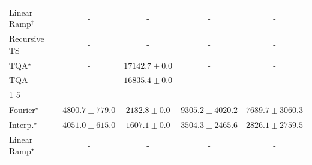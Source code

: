 \begin{tabular}{l|cccc|}
Linear Ramp$^\dagger$ & {\cellcolor[HTML]{000000}} \color[HTML]{F1F1F1} {\cellcolor{white}} \color{black} - & {\cellcolor[HTML]{000000}} \color[HTML]{F1F1F1} {\cellcolor{white}} \color{black} - & {\cellcolor[HTML]{000000}} \color[HTML]{F1F1F1} {\cellcolor{white}} \color{black} - & {\cellcolor[HTML]{000000}} \color[HTML]{F1F1F1} {\cellcolor{white}} \color{black} - \\
Recursive TS & {\cellcolor[HTML]{000000}} \color[HTML]{F1F1F1} {\cellcolor{white}} \color{black} - & {\cellcolor[HTML]{000000}} \color[HTML]{F1F1F1} {\cellcolor{white}} \color{black} - & {\cellcolor[HTML]{000000}} \color[HTML]{F1F1F1} {\cellcolor{white}} \color{black} - & {\cellcolor[HTML]{000000}} \color[HTML]{F1F1F1} {\cellcolor{white}} \color{black} - \\
TQA$^\star$ & {\cellcolor[HTML]{000000}} \color[HTML]{F1F1F1} {\cellcolor{white}} \color{black} - & {\cellcolor[HTML]{066D39}} \color[HTML]{F1F1F1} $17142.7\pm 0.0$ & {\cellcolor[HTML]{000000}} \color[HTML]{F1F1F1} {\cellcolor{white}} \color{black} - & {\cellcolor[HTML]{000000}} \color[HTML]{F1F1F1} {\cellcolor{white}} \color{black} - \\
TQA & {\cellcolor[HTML]{000000}} \color[HTML]{F1F1F1} {\cellcolor{white}} \color{black} - & {\cellcolor[HTML]{49AF61}} \color[HTML]{F1F1F1} $16835.4\pm 0.0$ & {\cellcolor[HTML]{000000}} \color[HTML]{F1F1F1} {\cellcolor{white}} \color{black} - & {\cellcolor[HTML]{000000}} \color[HTML]{F1F1F1} {\cellcolor{white}} \color{black} - \\
\cline{1-5}
\multicolumn{5}{c}{\rule{0pt}{8pt}SV} \\
\midrule
Fourier$^\star$ & {\cellcolor[HTML]{96B6D7}} \color[HTML]{000000} $4800.7\pm 779.0$ & {\cellcolor[HTML]{F4EDF6}} \color[HTML]{000000} $2182.8\pm 0.0$ & {\cellcolor[HTML]{023858}} \color[HTML]{F1F1F1} $9305.2\pm 4020.2$ & {\cellcolor[HTML]{0569A4}} \color[HTML]{F1F1F1} $7689.7\pm 3060.3$ \\
Interp.$^\star$ & {\cellcolor[HTML]{B9C6E0}} \color[HTML]{000000} $4051.0\pm 615.0$ & {\cellcolor[HTML]{FFF7FB}} \color[HTML]{000000} $1607.1\pm 0.0$ & {\cellcolor[HTML]{D1D2E6}} \color[HTML]{000000} $3504.3\pm 2465.6$ & {\cellcolor[HTML]{E5E1EF}} \color[HTML]{000000} $2826.1\pm 2759.5$ \\
Linear Ramp$^\star$ & {\cellcolor[HTML]{000000}} \color[HTML]{F1F1F1} {\cellcolor{white}} \color{black} - & {\cellcolor[HTML]{000000}} \color[HTML]{F1F1F1} {\cellcolor{white}} \color{black} - & {\cellcolor[HTML]{000000}} \color[HTML]{F1F1F1} {\cellcolor{white}} \color{black} - & {\cellcolor[HTML]{000000}} \color[HTML]{F1F1F1} {\cellcolor{white}} \color{black} - \\

\end{tabular}
